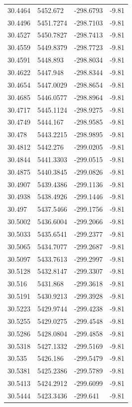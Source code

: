 \begin{table}[H]
\begin{tabular}{llll}
30.4464 & 5452.672 & -298.6793 & -9.81 \\
30.4496 & 5451.7274 & -298.7103 & -9.81 \\
30.4527 & 5450.7827 & -298.7413 & -9.81 \\
30.4559 & 5449.8379 & -298.7723 & -9.81 \\
30.4591 & 5448.893 & -298.8034 & -9.81 \\
30.4622 & 5447.948 & -298.8344 & -9.81 \\
30.4654 & 5447.0029 & -298.8654 & -9.81 \\
30.4685 & 5446.0577 & -298.8964 & -9.81 \\
30.4717 & 5445.1124 & -298.9275 & -9.81 \\
30.4749 & 5444.167 & -298.9585 & -9.81 \\
30.478 & 5443.2215 & -298.9895 & -9.81 \\
30.4812 & 5442.276 & -299.0205 & -9.81 \\
30.4844 & 5441.3303 & -299.0515 & -9.81 \\
30.4875 & 5440.3845 & -299.0826 & -9.81 \\
30.4907 & 5439.4386 & -299.1136 & -9.81 \\
30.4938 & 5438.4926 & -299.1446 & -9.81 \\
30.497 & 5437.5466 & -299.1756 & -9.81 \\
30.5002 & 5436.6004 & -299.2066 & -9.81 \\
30.5033 & 5435.6541 & -299.2377 & -9.81 \\
30.5065 & 5434.7077 & -299.2687 & -9.81 \\
30.5097 & 5433.7613 & -299.2997 & -9.81 \\
30.5128 & 5432.8147 & -299.3307 & -9.81 \\
30.516 & 5431.868 & -299.3618 & -9.81 \\
30.5191 & 5430.9213 & -299.3928 & -9.81 \\
30.5223 & 5429.9744 & -299.4238 & -9.81 \\
30.5255 & 5429.0275 & -299.4548 & -9.81 \\
30.5286 & 5428.0804 & -299.4858 & -9.81 \\
30.5318 & 5427.1332 & -299.5169 & -9.81 \\
30.535 & 5426.186 & -299.5479 & -9.81 \\
30.5381 & 5425.2386 & -299.5789 & -9.81 \\
30.5413 & 5424.2912 & -299.6099 & -9.81 \\
30.5444 & 5423.3436 & -299.641 & -9.81 \\

\end{tabular}
\end{table}

